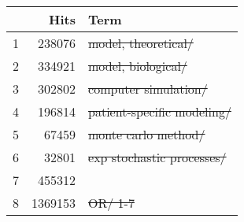 \def\modeladjterms{\parbox[t]{0.8\textwidth}{(model* ADJ3 (math* OR transmission OR dynamic* OR epidemi* OR compartmental OR deterministic OR individual OR agent OR network OR infectious disease* OR markov OR dynamic* OR simulat*)).mp.}}
\searchsize
\begin{tabular}{rrl}
	\toprule
	  &          Hits & Term                            \\
	\midrule
	1 &  \num{238076} & \st{model, theoretical/}        \\
	2 &  \num{334921} & \st{model, biological/}         \\
	3 &  \num{302802} & \st{computer simulation/}       \\
	4 &  \num{196814} & \st{patient-specific modeling/} \\
	5 &   \num{67459} & \st{monte carlo method/}        \\
	6 &   \num{32801} & \st{exp stochastic processes/}  \\
	7 &  \num{455312} & \st{\modeladjterms}             \\
	8 & \num{1369153} & \st{OR/ 1-7}                    \\
	\bottomrule
\end{tabular}
